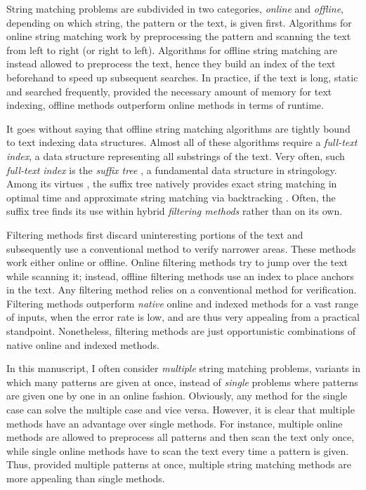 String matching problems are subdivided in two categories, \emph{online} and \emph{offline}, depending on which string, the pattern or the text, is given first.
Algorithms for online string matching work by preprocessing the pattern and scanning the text from left to right (or right to left).
Algorithms for offline string matching are instead allowed to preprocess the text,
hence they build an index of the text beforehand to speed up subsequent searches.
In practice, if the text is long, static and searched frequently, provided the necessary amount of memory for text indexing, offline methods outperform online methods in terms of runtime.

It goes without saying that offline string matching algorithms are tightly bound to text indexing data structures.
Almost all of these algorithms require a \emph{full-text index}, \ie a data structure representing all substrings of the text.
Very often, such \emph{full-text index} is the \emph{suffix tree} \citep{Weiner1973}, a fundamental data structure in stringology.
Among its virtues \citep{Apostolico1985}, the suffix tree natively provides exact string matching in optimal time and approximate string matching via backtracking \citep{Ukkonen1993}.
Often, the suffix tree finds its use within hybrid \emph{filtering methods} rather than on its own.

Filtering methods first discard uninteresting portions of the text and subsequently use a conventional method to verify narrower areas.
These methods work either online or offline.
Online filtering methods try to jump over the text while scanning it; instead, offline filtering methods use an index to place anchors in the text.
Any filtering method relies on a conventional method for verification.
Filtering methods outperform \emph{native} online and indexed methods for a vast range of inputs, \ie when the error rate is low, and are thus very appealing from a practical standpoint.
Nonetheless, filtering methods are just opportunistic combinations of native online and indexed methods.

In this manuscript, I often consider \emph{multiple} string matching problems, \ie variants in which many patterns are given at once, instead of \emph{single} problems where patterns are given one by one in an online fashion.
Obviously, any method for the single case can solve the multiple case and vice versa.
However, it is clear that multiple methods have an advantage over single methods.
For instance, multiple online methods are allowed to preprocess all patterns and then scan the text only once, while single online methods have to scan the text every time a pattern is given.
Thus, provided multiple patterns at once, multiple string matching methods are more appealing than single methods.

